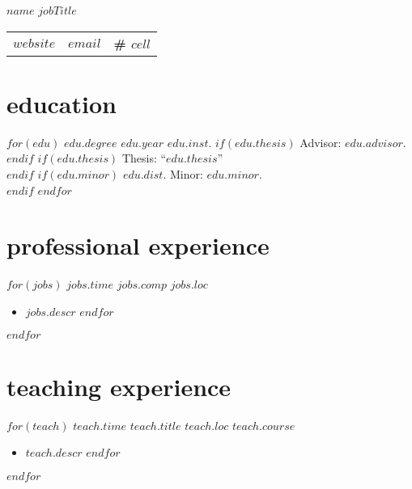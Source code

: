\documentclass[]{friggeri-cv}
\begin{document}
\header
  {$name$}
  {$jobTitle$}



\vspace{-0.4in}
\hspace{0.35in}
\begin{tabular}{p{7.25cm}p{6cm}p{6cm}}
  \textbf{\href{$website$}{$website$}} &
  \textbf{\href{mailto:$email$}{$email$}} &
  \textbf{\# $cell$}
\end{tabular}



\vspace{-0.05in}

\section{education}
\begin{entrylist}
$for(edu)$
  \entrypub
  {$edu.degree$}
  {$edu.year$}
  {$edu.inst$.}
  $if(edu.thesis)$
    {Advisor: $edu.advisor$}.\\
  $endif$
  $if(edu.thesis)$
    {Thesis: ``$edu.thesis$''}\\
  $endif$
  $if(edu.minor)$
    {$edu.dist$. Minor: $edu.minor$}.\\
  $endif$
$endfor$
\end{entrylist}



\vspace{-0.15in}
\section{professional experience}
\begin{entrylist}
$for(jobs)$
  \entryalt
  {$jobs.time$}
  {$jobs.comp$}
  {$jobs.loc$}
  \setlength\parskip{0pt}
  \begin{itemize}[noitemsep, leftmargin=0.2in]
    $for(jobs.descr)$
      \item $jobs.descr$
    $endfor$
  \end{itemize}
  \setlength\parskip{12pt}
$endfor$
\end{entrylist}



\vspace{-0.05in}
\section{teaching experience}
\begin{entrylist}
$for(teach)$
  \entry
  {$teach.time$}
  {$teach.title$}
  {$teach.loc$}
  {$teach.course$}
  \setlength\parskip{0pt}
  \begin{itemize}[noitemsep, leftmargin=0.2in]
    $for(teach.descr)$
      \item $teach.descr$
    $endfor$
  \end{itemize}
  \setlength\parskip{12pt}
$endfor$
\end{entrylist}
\end{document}
